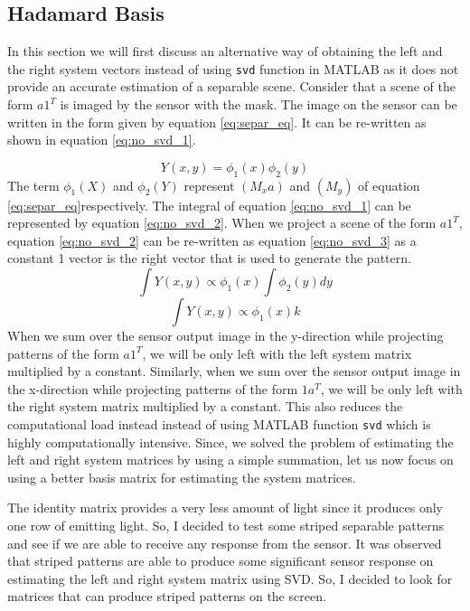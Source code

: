 \subsection{Hadamard Basis}
In this section we will first discuss an alternative way of obtaining the left and the right system vectors instead of using \texttt{svd} function in MATLAB as it does not provide an accurate estimation of a separable scene. Consider that a scene of the form $a1^T$ is imaged by the sensor with the mask. The image on the sensor can be written in the form given by equation \ref{eq:separ_eq}. It can be re-written as shown in equation \ref{eq:no_svd_1}.

\begin{equation}
Y(x,y) = \phi_1(x)\phi_2(y)
\label{eq:no_svd_1}
\end{equation}
The term $\phi_1(X)$ and $\phi_2(Y)$ represent $(M_xa)$ and $(M_y)$ of equation \ref{eq:separ_eq}respectively. The integral of equation \ref{eq:no_svd_1} can be represented by equation \ref{eq:no_svd_2}. When we project a scene of the form $a1^T$, equation \ref{eq:no_svd_2} can be re-written as equation \ref{eq:no_svd_3} as a constant 1 vector is the right vector that is used to generate the pattern.
\begin{equation}
\int Y(x,y) \propto \phi_1(x)\int \phi_2(y)dy
\label{eq:no_svd_2}
\end{equation}
\begin{equation}
\int Y(x,y) \propto \phi_1(x) k
\label{eq:no_svd_3}
\end{equation}
When we sum over the sensor output image in the y-direction while projecting  patterns of the  form $a1^T$, we will be only left with the left system matrix multiplied by a constant. Similarly, when we sum over the sensor output image in the x-direction while projecting  patterns of the  form $1a^T$, we will be only left with the right system matrix multiplied by a constant. This also reduces the computational load instead instead of using MATLAB function \texttt{svd} which is highly computationally intensive. Since, we solved the problem of estimating the left and right system matrices by using a simple summation, let us now focus on using a better basis matrix for estimating the system matrices. 

The identity matrix provides a very less amount of light since it produces only one row of emitting light. So, I decided to test some striped separable patterns and see if we are able to receive any response from the sensor. It was observed that striped patterns are able to produce some significant sensor response on estimating the left and right system matrix using SVD. So, I decided to look for matrices that can produce striped patterns on the screen. 

